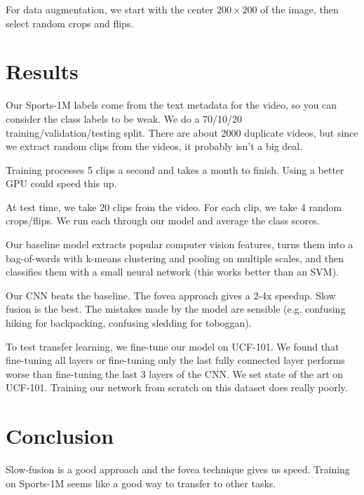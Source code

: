 \documentclass[a4paper]{article}
\begin{document}
For data augmentation, we start with the center $200 \times 200$ of the image,
then select random crops and flips.

\section{Results}
Our Sports-1M labels come from the text metadata for the video, so you can 
consider the class labels to be weak. We do a 70/10/20 
training/validation/testing split. There are about 2000 duplicate videos,
but since we extract random clips from the videos, it probably isn't a big deal.

Training processes 5 clips a second and takes a month to finish. Using a better
GPU could speed this up.

At test time, we take 20 clips from the video. For each clip, we take 4
random crops/flips. We run each through our model and average the class
scores.

Our baseline model extracts popular computer vision features, turns them
into a bag-of-words with k-means clustering and pooling on multiple scales,
and then classifies them with a small neural network (this works better than
an SVM).

Our CNN beats the baseline. The fovea approach gives a 2-4x speedup. Slow
fusion is the best. The mistakes made by the model are sensible (e.g. confusing
hiking for backpacking, confusing sledding for toboggan).

To test transfer learning, we fine-tune our model on UCF-101. We found that
fine-tuning all layers or fine-tuning only the last fully connected layer
performs worse than fine-tuning the last 3 layers of the CNN. We set state of 
the art on UCF-101. Training our network from scratch on this dataset does 
really poorly.

\section{Conclusion}
Slow-fusion is a good approach and the fovea technique gives us speed. Training
on Sports-1M seems like a good way to transfer to other tasks.
\end{document}
